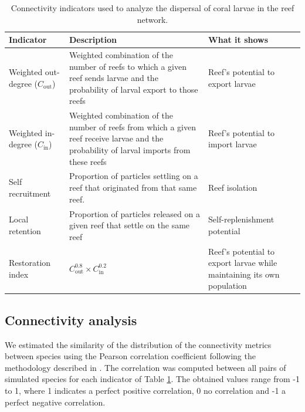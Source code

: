 \documentclass[preprint,12pt,authoryear]{elsarticle}
\begin{document}
	\begin{table}
		\begin{adjustwidth}{-1in}{-1in}
			\centering
			\small
			\begin{tabular}{p{}p{}p{}}
				\hline
				\textbf{Indicator} & \textbf{Description} & \textbf{What it shows} \\
				\hline
				Weighted out-degree ($C_\text{out}$) & Weighted combination of the number of reefs to which a given reef sends larvae and the probability of larval export to those reefs & Reef's potential to export larvae \\
				Weighted in-degree ($C_\text{in}$) & Weighted combination of the number of reefs from which a given reef receive larvae and the probability of larval imports from these reefs & Reef's potential to import larvae \\
				Self recruitment & Proportion of particles settling on a reef that originated from that same reef. & Reef isolation \\
				Local retention & Proportion of particles released on a given reef that settle on the same reef & Self-replenishment potential \\
				Restoration index & $C_\text{out}^{0.8} \times C_\text{in}^{0.2}$ & Reef's potential to export larvae while maintaining its own population \\
				\hline
			\end{tabular}
		\end{adjustwidth}
		\caption{Connectivity indicators used to analyze the dispersal of coral larvae in the reef network.}\label{tab:indicators}
	\end{table}
	
	\subsection*{Connectivity analysis}
	
	We estimated the similarity of the distribution of the connectivity metrics between species using the Pearson correlation coefficient following the methodology described in \cite{boccaletti2014structure}. The correlation was computed between all pairs of simulated species for each indicator of Table \ref{tab:indicators}. The obtained values range from -1 to 1, where 1 indicates a perfect positive correlation, 0 no correlation and -1 a perfect negative correlation.
	
\end{document}
